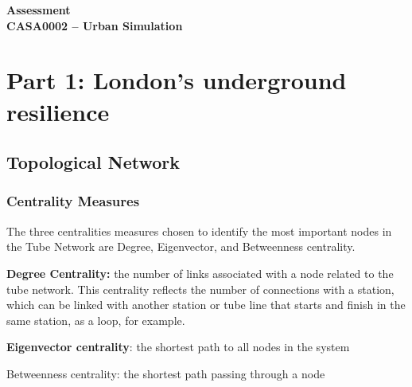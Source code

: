 \documentclass[10pt]{report}
\author{Felipe Santos Almeida}
\numberwithin{figure}{section}
\numberwithin{table}{section}
\begin{document}

\begin{center}
    \vspace*{-3cm}
\end{center}   
    {\LARGE\textbf{Assessment\\
    CASA0002 – Urban Simulation\\}}
    

\section{Part 1: London’s underground resilience}


 \subsection{Topological Network}
\subsubsection{Centrality Measures } 
        The three centralities measures chosen to identify the most important nodes in the Tube Network are Degree, Eigenvector, and Betweenness centrality.
        
        \vspace{5mm} %
        
        \textbf{Degree Centrality:} the number of links associated with a node related to the tube network. This centrality reflects the number of connections with a station, which can be linked with another station or tube line that starts and finish in the same station, as a loop, for example. 
        
  \vspace{5mm} %
        
        \textbf{Eigenvector centrality}:  the shortest path to all nodes in the system

   \vspace{5mm} %
   
        Betweenness centrality: the shortest path passing through a node
\end{document}
